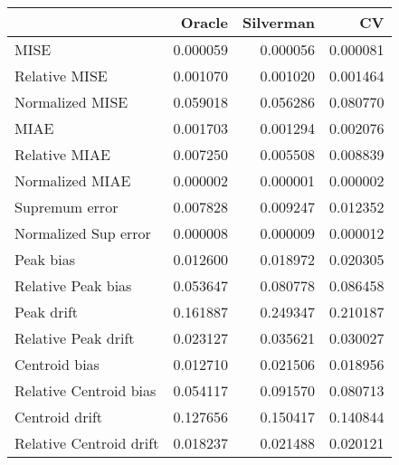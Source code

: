 \begin{tabular}{lrrr}
  \toprule
 & Oracle & Silverman & CV \\ 
  \midrule
MISE & 0.000059 & 0.000056 & 0.000081 \\ 
  Relative MISE & 0.001070 & 0.001020 & 0.001464 \\ 
  Normalized MISE & 0.059018 & 0.056286 & 0.080770 \\ 
  MIAE & 0.001703 & 0.001294 & 0.002076 \\ 
  Relative MIAE & 0.007250 & 0.005508 & 0.008839 \\ 
  Normalized MIAE & 0.000002 & 0.000001 & 0.000002 \\ 
  Supremum error & 0.007828 & 0.009247 & 0.012352 \\ 
  Normalized Sup error & 0.000008 & 0.000009 & 0.000012 \\ 
  Peak bias & 0.012600 & 0.018972 & 0.020305 \\ 
  Relative Peak bias & 0.053647 & 0.080778 & 0.086458 \\ 
  Peak drift & 0.161887 & 0.249347 & 0.210187 \\ 
  Relative Peak drift & 0.023127 & 0.035621 & 0.030027 \\ 
  Centroid bias & 0.012710 & 0.021506 & 0.018956 \\ 
  Relative Centroid bias & 0.054117 & 0.091570 & 0.080713 \\ 
  Centroid drift & 0.127656 & 0.150417 & 0.140844 \\ 
  Relative Centroid drift & 0.018237 & 0.021488 & 0.020121 \\ 
   \bottomrule
\end{tabular}

